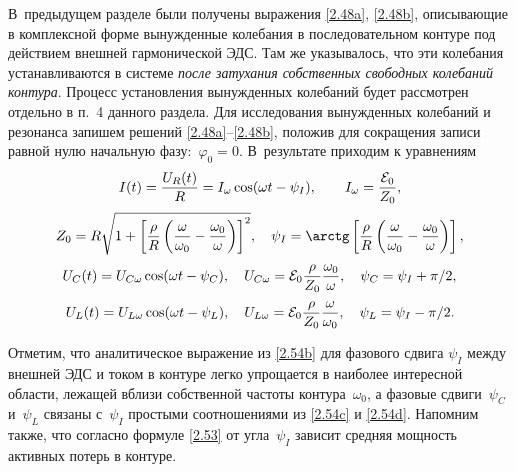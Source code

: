 \label{sec:resonance}

\label{sec:ures}

В~предыдущем разделе были получены выражения \eqref{2.48a}, \eqref{2.48b}, 
описывающие в комплексной форме вынужденные колебания в последовательном 
контуре под действием внешней гармонической ЭДС. Там же указывалось, 
что эти колебания устанавливаются в системе 
\emph{после затухания собственных свободных колебаний контура}. Процесс
установления вынужденных колебаний будет рассмотрен отдельно в п.~4 данного
раздела. Для исследования вынужденных колебаний и резонанса запишем
 решений \eqref{2.48a}--\eqref{2.48b},  
положив для сокращения записи равной нулю начальную фазу:~$\varphi_0=0$. 
В~результате приходим к уравнениям
		\begin{equation}
			\eqmark{2.54a}
			I(t)=\frac{U_R(t)}{R}=I_{\omega}\cos(\omega t-\psi_I), \qquad 
            I_{\omega}=\frac{\mathcal{E}_0}{Z_0},
		\end{equation}
		\begin{equation}
			\eqmark{2.54b}
Z_0=R\sqrt{1+\left [\frac{\rho}{R}\left (\frac{\omega}{\omega_0}-\frac{\omega_0}{\omega}\right )\right ]^2},\quad
\psi_I=\arctg\left [\frac{\rho}{R}\left (\frac{\omega}{\omega_0}-\frac{\omega_0}{\omega}\right )\right],
		\end{equation}
		\begin{equation}
			\eqmark{2.54c}
U_C(t)=U_{C\omega}\cos(\omega t-\psi_C), 
\quad 
U_{C\omega}=\mathcal{E}_0\dfrac{\rho}{Z_0}\dfrac{\omega_0}{\omega}, 
\quad 
\psi_C=\psi_I+\pi/2,
		\end{equation}
		\begin{equation}
			\eqmark{2.54d}
U_L(t)=U_{L\omega}\cos(\omega t-\psi_L), 
\quad 
U_{L\omega}=\mathcal{E}_0\dfrac{\rho}{Z_0}\dfrac{\omega}{\omega_0}, 
\quad 
\psi_L=\psi_I-\pi/2.
		\end{equation}

Отметим, что аналитическое выражение из \eqref{2.54b} для фазового сдвига
$\psi_I$ между внешней ЭДС и током в контуре легко упрощается в наиболее
интересной области, лежащей вблизи собственной частоты контура~$\omega_0$, а
фазовые сдвиги~$\psi_C$ и~$\psi_L$ связаны с~$\psi_I$ простыми соотношениями из
\eqref{2.54c} и \eqref{2.54d}. Напомним также, что согласно формуле \eqref{2.53}
от угла~$\psi_I$ зависит средняя мощность активных потерь в контуре.

